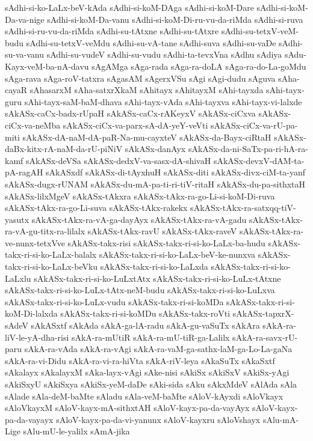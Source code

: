 {sAdhi-si-ko-LaLx-beV-kAda
sAdhi-si-koM-DAga
sAdhi-si-koM-Dare
sAdhi-si-koM-Da-va-nige
sAdhi-si-koM-Da-vanu
sAdhi-si-koM-Di-ru-vu-da-riMda
sAdhi-si-ruva
sAdhi-si-ru-vu-da-riMda
sAdhi-su-tAtxne
sAdhi-su-tAtxre
sAdhi-su-tetxV-veM-budu
sAdhi-su-tetxV-veMdu
sAdhi-su-vA-tane
sAdhi-suva
sAdhi-su-vaDe
sAdhi-su-va-vanu
sAdhi-su-vudeV
sAdhi-su-vudu
sAdhi-ta-tevxVna
sAdhu
sAdiya
sAdu-Kayx-veM-ba-nA-davu
sAgAMga
sAga-rada
sAga-ra-doLA
sAga-ra-do-La-goMdu
sAga-rava
sAga-roV-tatxra
sAgasAM
sAgerxVSu
sAgi
sAgi-dudu
sAguva
sAha-cayaR
sAhasarxM
sAha-satxrXkaM
sAhitayx
sAhitayxM
sAhi-tayxda
sAhi-tayx-guru
sAhi-tayx-saM-baM-dhava
sAhi-tayx-vAda
sAhi-tayxva
sAhi-tayx-vi-lalxde
sAkASx-caCx-badx-rUpaH
sAkASx-caCx-rAKeyxV
sAkASx-ciCxva
sAkASx-ciCx-va-neMba
sAkASx-ciCx-va-parx-sA-dA-yeY-veVti
sAkASx-ciCx-va-rU-pa-miti
sAkASx-dA-naM-dA-paR-Na-mu-cayxteV
sAkASx-da-Bayx-ciRtaH
sAkASx-daBx-kitx-rA-naM-da-rU-piNiV
sAkASx-danAyx
sAkASx-da-ni-SaTx-pa-ri-hA-ra-kamf
sAkASx-deVSa
sAkASx-dedxV-va-sasx-dA-shivaH
sAkASx-devxV-dAM-ta-pA-ragAH
sAkASxdf
sAkASx-di-tAyxhuH
sAkASx-diti
sAkASx-divx-ciM-ta-yanf
sAkASx-dugx-rUNAM
sAkASx-du-mA-pa-ti-ri-tiV-ritaH
sAkASx-du-pa-sithxtaH
sAkASx-lilxMgeV
sAkASx-tAkxra
sAkASx-tAkx-ra-go-Li-si-koM-Di-ruva
sAkASx-tAkx-ra-go-Li-suva
sAkASx-tAkx-rakekx
sAkASx-tAkx-ra-satxqq-tiV-yasutx
sAkASx-tAkx-ra-vA-ga-dayAyx
sAkASx-tAkx-ra-vA-gadu
sAkASx-tAkx-ra-vA-gu-titx-ra-lilalx
sAkASx-tAkx-ravU
sAkASx-tAkx-raveV
sAkASx-tAkx-ra-ve-nunx-tetxVve
sAkASx-takx-risi
sAkASx-takx-ri-si-ko-LaLx-ba-hudu
sAkASx-takx-ri-si-ko-LaLx-balalx
sAkASx-takx-ri-si-ko-LaLx-beV-ke-nunxva
sAkASx-takx-ri-si-ko-LaLx-beVku
sAkASx-takx-ri-si-ko-LaLxda
sAkASx-takx-ri-si-ko-LaLxlu
sAkASx-takx-ri-si-ko-LuLxtAtx
sAkASx-takx-ri-si-ko-LuLx-tAtxne
sAkASx-takx-ri-si-ko-LuLx-tAtx-neM-budu
sAkASx-takx-ri-si-ko-LuLxva
sAkASx-takx-ri-si-ko-LuLx-vudu
sAkASx-takx-ri-si-koMDa
sAkASx-takx-ri-si-koM-Di-lalxda
sAkASx-takx-ri-si-koMDu
sAkASx-takx-roVti
sAkASx-tapxrX-sAdeV
sAkASxtf
sAkAda
sAkA-ga-lA-radu
sAkA-gu-vaSuTx
sAkAra
sAkA-ra-liV-le-yA-dha-risi
sAkA-ra-mUtiR
sAkA-ra-mU-tiR-ga-Lalilx
sAkA-ra-savx-rU-paru
sAkA-ra-vAda
sAkA-ra-vAgi
sAkA-ra-vaM-ga-sathx-laM-ga-Lo-La-gaNa
sAkA-ra-vi-Didu
sAkA-ra-vi-ra-hiVta
sAkA-riV-leya
sAkaSuTx
sAkaSxtf
sAkalayx
sAkalayxM
sAka-layx-vAgi
sAke-nisi
sAkiSx
sAkiSxV
sAkiSx-yAgi
sAkiSxyU
sAkiSxya
sAkiSx-yeM-daDe
sAki-sida
sAku
sAkxMdeV
sAlAda
sAla
sAlade
sAla-deM-baMte
sAladu
sAla-veM-baMte
sAloV-kAyxdi
sAloVkayx
sAloVkayxM
sAloV-kayx-mA-sithxtAH
sAloV-kayx-pa-da-vayAyx
sAloV-kayx-pa-da-vayayx
sAloV-kayx-pa-da-vi-yanunx
sAloV-kayxru
sAloVshayx
sAlu-mA-Lige
sAlu-mU-le-yalilx
sAmA-jika
}
